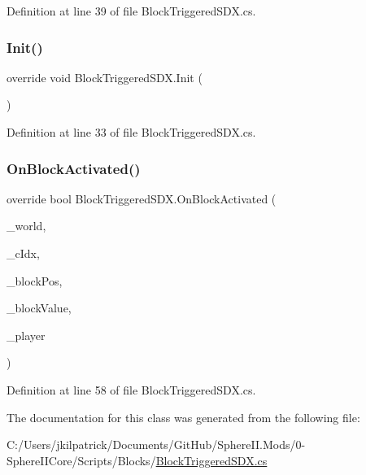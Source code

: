 Definition at line 39 of file Block\+Triggered\+S\+D\+X.\+cs.

\mbox{\label{class_block_triggered_s_d_x_ab1f3e6b06186cba913e076dafc6b4624}} 
\subsubsection{\texorpdfstring{Init()}{Init()}}
{\footnotesize\ttfamily override void Block\+Triggered\+S\+D\+X.\+Init (\begin{DoxyParamCaption}{ }\end{DoxyParamCaption})}



Definition at line 33 of file Block\+Triggered\+S\+D\+X.\+cs.

\mbox{\label{class_block_triggered_s_d_x_ab8f68218bbac30a74c3d2c83ea017b44}} 
\subsubsection{\texorpdfstring{OnBlockActivated()}{OnBlockActivated()}}
{\footnotesize\ttfamily override bool Block\+Triggered\+S\+D\+X.\+On\+Block\+Activated (\begin{DoxyParamCaption}\item[{World\+Base}]{\+\_\+world,  }\item[{int}]{\+\_\+c\+Idx,  }\item[{Vector3i}]{\+\_\+block\+Pos,  }\item[{Block\+Value}]{\+\_\+block\+Value,  }\item[{Entity\+Alive}]{\+\_\+player }\end{DoxyParamCaption})}



Definition at line 58 of file Block\+Triggered\+S\+D\+X.\+cs.



The documentation for this class was generated from the following file\+:\begin{DoxyCompactItemize}
\item 
C\+:/\+Users/jkilpatrick/\+Documents/\+Git\+Hub/\+Sphere\+I\+I.\+Mods/0-\/\+Sphere\+I\+I\+Core/\+Scripts/\+Blocks/\mbox{\hyperlink{_block_triggered_s_d_x_8cs}{Block\+Triggered\+S\+D\+X.\+cs}}\end{DoxyCompactItemize}
